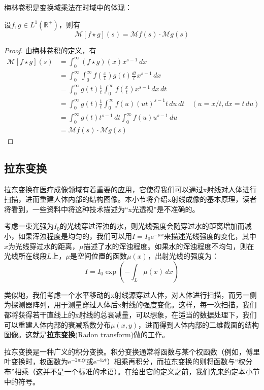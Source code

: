 梅林卷积是变换域乘法在时域中的体现：

\begin{proposition}[梅林卷积的变换性质]
    设$f,g\in L^1(\mathbb{R}^+)$，则有
    \[\mathcal{M} [f\star g](s)=\mathcal{M} f(s)\cdot \mathcal{M} g(s)\]
\end{proposition}
\begin{proof}
    由梅林卷积的定义，有
    \begin{align*}
        \mathcal{M} [f\star g](s)&=\int_0^{\infty}(f\star g)(x)x^{s-1}\,dx\\
        &=\int_0^{\infty}\int_0^{\infty}f\left(\frac{x}{t}\right)g(t)\frac{dt}{t}x^{s-1}\,dx\\
        &=\int_0^{\infty}g(t)\frac{1}{t}\int_0^{\infty}f\left(\frac{x}{t}\right)x^{s-1}\,dx\,dt\\
        &=\int_0^{\infty}g(t)\frac{1}{t}\int_0^{\infty}f(u)(ut)^{s-1}t\,du\,dt\quad (u=x/t,dx=t\,du)\\
        &=\int_0^{\infty}g(t)t^{s-1}\,dt\int_0^{\infty}f(u)u^{s-1}\,du\\
        &=\mathcal{M} f(s)\cdot \mathcal{M} g(s)
    \end{align*}
\end{proof}

\subsection{拉东变换}\label{sub:radon}

拉东变换在医疗成像领域有着重要的应用，它使得我们可以通过x射线对人体进行扫描，进而重建人体内部的结构图像。本小节将介绍x射线成像的基本原理，读者将看到，一些资料中将这种技术描述为“x光透视”是不准确的。

考虑一束光强为$I_0$的光线穿过浑浊的水，则光线强度会随穿过水的距离增加而减小，如果浑浊程度是均匀的，我们可以用$I=I_0 \mathrm{e}^{-\mu x}$来描述光线强度的变化，其中$x$为光线穿过水的距离，$\mu$描述了水的浑浊程度。如果水的浑浊程度不均匀，则在光线所在线段$L$上，$\mu$是空间位置的函数$\mu(x)$，出射光线的强度为：
\[I=I_0 \exp\left(-\int_{L}\mu(x)\,dx\right)\]

类似地，我们考虑一个水平移动的x射线源穿过人体，对人体进行扫描，而另一侧为探测器阵列，用于测量穿过人体后x射线的强度变化。这样，每一次扫描，我们都将获得若干直线上的x射线的总衰减量，可以想象，在适当的数据处理下，我们可以重建人体内部的衰减系数分布$\mu(x,y)$，进而得到人体内部的二维截面的结构图像。这就是\textbf{拉东变换}(Radon transform)做的工作。

拉东变换是一种广义的积分变换。积分变换通常将函数与某个权函数（例如，傅里叶变换时，权函数为$\mathrm{e}^{-2\pi \mathrm{i}\xi t}$或$\mathrm{e}^{-\mathrm{i}\omega t}$）相乘再积分，而拉东变换的则将函数与“权分布”相乘（这并不是一个标准的术语）。在给出它的定义之前，我们先来约定本小节中的符号。

